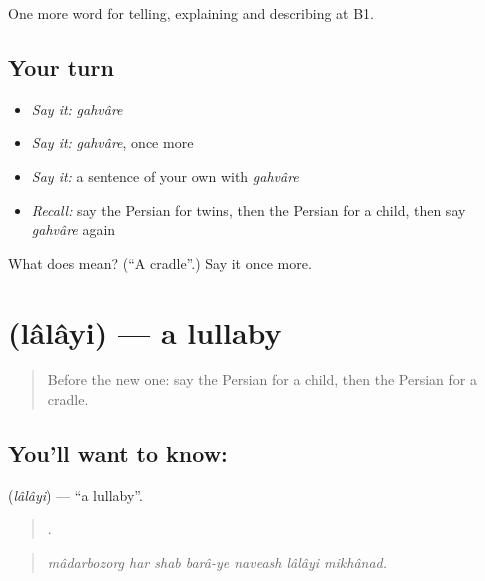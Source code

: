 \begin{grammarlens}[title={What you've built}]
One more word for telling, explaining and describing at B1.
\end{grammarlens}

\subsection*{Your turn}
\begin{itemize}
\raggedright
  \item \emph{Say it:} \emph{gahvâre}
  \item \emph{Say it:} \emph{gahvâre}, once more
  \item \emph{Say it:} a sentence of your own with \emph{gahvâre}
  \item \emph{Recall:} say the Persian for twins, then the Persian for a child, then say \emph{gahvâre} again
\end{itemize}

\begin{tcolorbox}[breakable,colback=teal!4,colframe=teal!35!black,title={Before you move on}]
What does  mean? (\textquotedblleft{}A cradle\textquotedblright{}.) Say it once more.
\end{tcolorbox}
\section[\texorpdfstring{\fa{لالایی} (lâlâyi)}{لالایی (lâlâyi)}]{ (lâlâyi) — a lullaby}

\label{lesson:FA-C502-lalayi}



\begin{quote}
Before the new one: say the Persian for a child, then the Persian for a cradle.
\end{quote}

\subsection*{You'll want to know: }
\textbf{} (\emph{lâlâyi}) — \textquotedblleft{}a lullaby\textquotedblright{}.

\begin{quote}
       .
\end{quote}

\begin{quote}
\emph{mâdarbozorg har shab barâ-ye naveash lâlâyi mikhânad.}
\end{quote}


